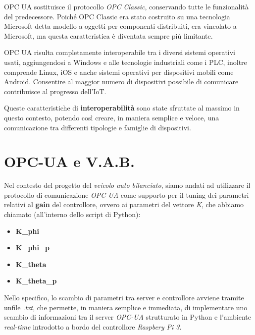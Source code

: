 OPC UA sostituisce il protocollo \textit{OPC Classic}, conservando tutte le funzionalità del predecessore. Poiché OPC Classic era stato costruito su una tecnologia Microsoft detta modello a oggetti per componenti distribuiti, era vincolato a Microsoft, ma questa caratteristica è diventata sempre più limitante.

OPC UA risulta completamente interoperabile tra i diversi sistemi operativi usati, aggiungendosi a Windows e alle tecnologie industriali come i PLC, inoltre comprende Linux, iOS e anche sistemi operativi per dispositivi mobili come Android. Consentire al maggior numero di dispositivi possibile di comunicare contribuisce al progresso dell'IoT.

Queste caratteristiche di \textbf{interoperabilità} sono state sfruttate al massimo in questo contesto, potendo così creare, in maniera semplice e veloce, una comunicazione tra differenti tipologie e famiglie di dispositivi.

\section{OPC-UA e V.A.B.}
Nel contesto del progetto del \textit{veicolo auto bilanciato}, siamo andati ad utilizzare il protocollo di comunicazione \textit{OPC-UA} come supporto per il tuning dei parametri relativi al \textbf{gain} del controllore, ovvero ai parametri del vettore \textit{K}, che abbiamo chiamato (all'interno dello script di Python):
\begin{itemize}
	\item \textbf{K\_phi}
	\item \textbf{K\_phi\_p}
	\item \textbf{K\_theta}
	\item \textbf{K\_theta\_p}
\end{itemize}

Nello specifico, lo scambio di parametri tra server e controllore avviene tramite unfile \textit{.txt}, che permette, in maniera semplice e immediata, di implementare uno scambio di informazioni tra il server \textit{OPC-UA} strutturato in Python e l'ambiente \textit{real-time} introdotto a bordo del controllore \textit{Raspbery Pi 3}.


